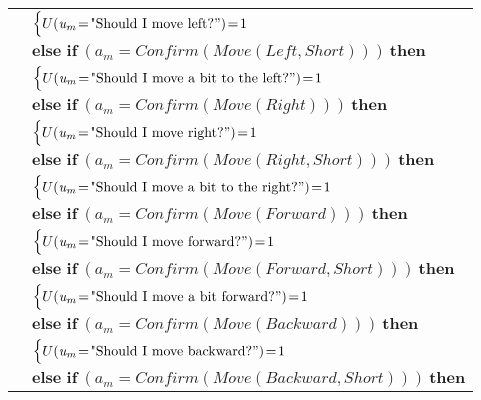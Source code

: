 \begin{footnotesize}
\begin{longtable}{p{2cm}l}
& \;\;\;\;\; $ \begin{cases}U(\mathit{u_m}\!=\!\text{"Should I move left?}")\!=\!1 \end{cases}$ \vspace{1mm} \\ & $ \textbf{else if} \ (\mathit{a_m}\!=\!\mathit{Confirm(Move(Left,Short))}) \ \textbf{then}$ \\
& \;\;\;\;\; $ \begin{cases}U(\mathit{u_m}\!=\!\text{"Should I move a bit to the left?}")\!=\!1 \end{cases}$ \vspace{1mm} \\ & $ \textbf{else if} \ (\mathit{a_m}\!=\!\mathit{Confirm(Move(Right))}) \ \textbf{then}$ \\
& \;\;\;\;\; $ \begin{cases}U(\mathit{u_m}\!=\!\text{"Should I move right?}")\!=\!1 \end{cases}$ \vspace{1mm} \\ & $ \textbf{else if} \ (\mathit{a_m}\!=\!\mathit{Confirm(Move(Right,Short))}) \ \textbf{then}$ \\
& \;\;\;\;\; $ \begin{cases}U(\mathit{u_m}\!=\!\text{"Should I move a bit to the right?}")\!=\!1 \end{cases}$ \vspace{1mm} \\ & $ \textbf{else if} \ (\mathit{a_m}\!=\!\mathit{Confirm(Move(Forward))}) \ \textbf{then}$ \\
& \;\;\;\;\; $ \begin{cases}U(\mathit{u_m}\!=\!\text{"Should I move forward?}")\!=\!1 \end{cases}$ \vspace{1mm} \\ & $ \textbf{else if} \ (\mathit{a_m}\!=\!\mathit{Confirm(Move(Forward,Short))}) \ \textbf{then}$ \\
& \;\;\;\;\; $ \begin{cases}U(\mathit{u_m}\!=\!\text{"Should I move a bit forward?}")\!=\!1 \end{cases}$ \vspace{1mm} \\ & $ \textbf{else if} \ (\mathit{a_m}\!=\!\mathit{Confirm(Move(Backward))}) \ \textbf{then}$ \\
& \;\;\;\;\; $ \begin{cases}U(\mathit{u_m}\!=\!\text{"Should I move backward?}")\!=\!1 \end{cases}$ \vspace{1mm} \\ & $ \textbf{else if} \ (\mathit{a_m}\!=\!\mathit{Confirm(Move(Backward,Short))}) \ \textbf{then}$ \\

\end{longtable}
\end{footnotesize}
